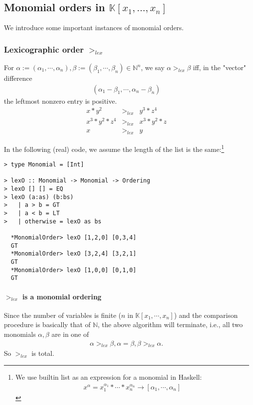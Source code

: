 \documentclass[11pt]{book}
\begin{document}
\subsection{Monomial orders in $\mathbb{K}[x_1, ... , x_n]$}
\label{MonomialOrders}
We introduce some important instances of monomial orders.

\subsubsection{Lexicographic order $>_{lex}$}
For $\alpha := (\alpha_1, \cdots, \alpha_n), \beta := (\beta_1, \cdots, \beta_n) \in \mathbb{N}^n$, we say $\alpha >_{lex} \beta$ iff, in the "vector" difference
\begin{eqnarray}
(\alpha_1- \beta_1, \cdots, \alpha_n -\beta_n)
\end{eqnarray}
the leftmost nonzero entry is positive.
\begin{eqnarray}
x * y^2 &>_{lex}& y^3 * z^4 \\
x^3 * y^2 * z^4 &>_{lex}& x^3 * y^2 * z \\
x &>_{lex}& y
\end{eqnarray}

In the following (real) code, we assume the length of the list is the same:\footnote{
We use builtin list as an expression for a monomial in Haskell:
\begin{eqnarray}
x^\alpha = x_1^{\alpha_1} * \cdots * x_n^{\alpha_n} \to [\alpha_1, \cdots, \alpha_n]
\end{eqnarray}
}

\begin{verbatim}
> type Monomial = [Int]

> lexO :: Monomial -> Monomial -> Ordering
> lexO [] [] = EQ
> lexO (a:as) (b:bs)
>   | a > b = GT
>   | a < b = LT
>   | otherwise = lexO as bs

  *MonomialOrder> lexO [1,2,0] [0,3,4]
  GT
  *MonomialOrder> lexO [3,2,4] [3,2,1]
  GT
  *MonomialOrder> lexO [1,0,0] [0,1,0]
  GT
\end{verbatim}

\paragraph{$>_{lex}$ is a monomial ordering}
Since the number of variables is finite ($n$ in $\mathbb{K}[x_1, \cdots, x_n]$) and the comparison procedure is basically that of $\mathbb{N}$, the above algorithm will terminate, i.e., all two monomials $\alpha, \beta$ are in one of
\begin{eqnarray}
\alpha >_{lex} \beta, \alpha = \beta, \beta >_{lex} \alpha.
\end{eqnarray}
So $>_{lex}$ is total.
\end{document}
